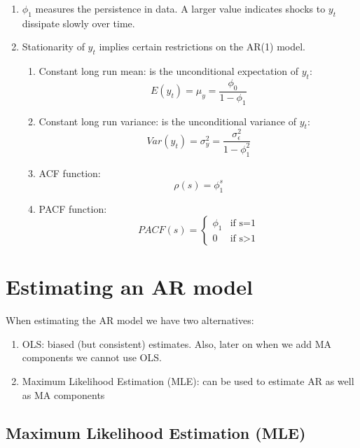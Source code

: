 \documentclass[]{book}
\providecommand{\tightlist}{%
  \setlength{\itemsep}{0pt}\setlength{\parskip}{0pt}}
\theoremstyle{definition}
\theoremstyle{definition}
\theoremstyle{definition}
\theoremstyle{remark}
\begin{document}
\begin{enumerate}
\def\labelenumi{\arabic{enumi}.}
\item
  \(\displaystyle \phi_1\) measures the persistence in data. A larger
  value indicates shocks to \(y_t\) dissipate slowly over time.
\item
  Stationarity of \(y_t\) implies certain restrictions on the AR(1)
  model.

  \begin{enumerate}
  \def\labelenumii{\roman{enumii}.}
  \tightlist
  \item
    Constant long run mean: is the unconditional expectation of \(y_t\):
    \[ E(y_t) = \mu_y= \frac{\phi_0}{1-\phi_1}  \]
  \item
    Constant long run variance: is the unconditional variance of
    \(y_t\):
    \[ Var(y_t)=\sigma^2_y= \frac{\sigma^2_\epsilon}{1-\phi_1^2}\]
  \item
    ACF function: \[ \rho(s) = \phi_1^s\]
  \item
    PACF function: \begin{equation*}
      PACF(s) =
      \begin{cases}
    \phi_1 & \text{if  s=1}\\
    0 & \text{if s>1}
      \end{cases}
     \end{equation*}
  \end{enumerate}
\end{enumerate}

\hypertarget{estimating-an-ar-model}{%
\section{Estimating an AR model}\label{estimating-an-ar-model}}

When estimating the AR model we have two alternatives:

\begin{enumerate}
\def\labelenumi{\arabic{enumi}.}
\item
  OLS: biased (but consistent) estimates. Also, later on when we add MA
  components we cannot use OLS.
\item
  Maximum Likelihood Estimation (MLE): can be used to estimate AR as
  well as MA components
\end{enumerate}

\hypertarget{maximum-likelihood-estimation-mle}{%
\subsection{Maximum Likelihood Estimation
(MLE)}\label{maximum-likelihood-estimation-mle}}
\end{document}
